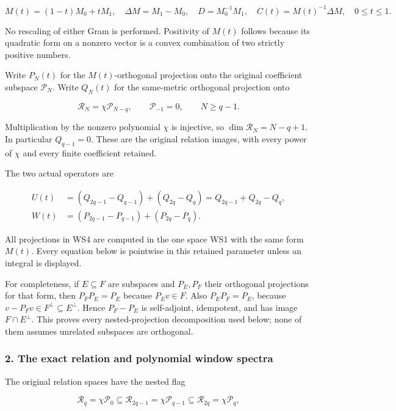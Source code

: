\documentclass{article}
\begin{document}
\[
M(t)=(1-t)M_0+tM_1,
\quad \Delta M=M_1-M_0,
\quad D=M_0^{-1}M_1,
\quad C(t)=M(t)^{-1}\Delta M,
\quad 0\le t\le1.
\tag{WS2}
\]

No rescaling of either Gram is performed. Positivity of \(M(t)\) follows because its quadratic form on a nonzero vector is a convex combination of two strictly positive numbers.

Write \(P_N(t)\) for the \(M(t)\)-orthogonal projection onto the original coefficient subspace \(\mathcal P_N\). Write \(Q_N(t)\) for the same-metric orthogonal projection onto

\[
\mathcal R_N=\chi\mathcal P_{N-q},
\qquad \mathcal P_{-1}=0,
\qquad N\ge q-1.
\tag{WS3}
\]

Multiplication by the nonzero polynomial \(\chi\) is injective, so \(\dim\mathcal R_N=N-q+1\). In particular \(Q_{q-1}=0\). These are the original relation images, with every power of \(\chi\) and every finite coefficient retained.

The two actual operators are

\[
\begin{aligned}
U(t)&=(Q_{2q-1}-Q_{q-1})+(Q_{2q}-Q_q)
     =Q_{2q-1}+Q_{2q}-Q_q,\\
W(t)&=(P_{2q-1}-P_{q-1})+(P_{2q}-P_q).
\end{aligned}
\tag{WS4}
\]

All projections in WS4 are computed in the one space WS1 with the same form \(M(t)\). Every equation below is pointwise in this retained parameter unless an integral is displayed.

For completeness, if \(E\subseteq F\) are subspaces and \(P_E,P_F\) their orthogonal projections for that form, then \(P_FP_E=P_E\) because \(P_Ev\in F\). Also \(P_E P_F=P_E\), because \(v-P_Fv\in F^\perp\subseteq E^\perp\). Hence \(P_F-P_E\) is self-adjoint, idempotent, and has image \(F\cap E^\perp\). This proves every nested-projection decomposition used below; none of them assumes unrelated subspaces are orthogonal.

\subsubsection{2. The exact relation and polynomial window spectra}\label{endpoint-window_review--the-exact-relation-and-polynomial-window-spectra}

The original relation spaces have the nested flag

\[
\mathcal R_q=\chi\mathcal P_0
\subseteq\mathcal R_{2q-1}=\chi\mathcal P_{q-1}
\subseteq\mathcal R_{2q}=\chi\mathcal P_q,
\tag{WS5}
\]
\end{document}
